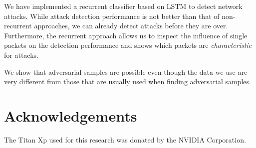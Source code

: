 \documentclass[conference]{IEEEtran}
\begin{document}
We have implemented a recurrent classifier based on LSTM to detect network attacks. While attack detection performance is not better than that of non-recurrent approaches, we can already detect attacks before they are over. Furthermore, the recurrent approach allows us to inspect the influence of single packets on the detection performance and shows which packets are \textit{characteristic} for attacks.

We show that adversarial samples are possible even though the data we use are very different from those that are usually used when finding adversarial samples.




\section*{Acknowledgements}
The Titan Xp used for this research was donated by the NVIDIA Corporation.
\end{document}
